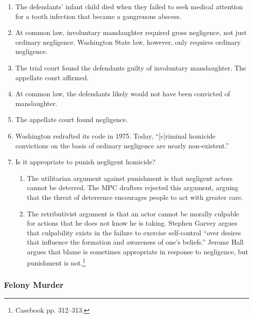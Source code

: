 \begin{enumerate}
    \item The defendants' infant child died when they failed to seek medical attention for a tooth infection that became a gangrenous abscess.
    \item At common law, involuntary manslaughter required gross negligence, not just ordinary negligence. Washington State law, however, only requires ordinary negligence.
    \item The trial court found the defendants guilty of involuntary manslaughter. The appellate court affirmed.
    \item At common law, the defendants likely would not have been convicted of manslaughter.
    \item The appellate court found negligence.
    \item Washington redrafted its code in 1975. Today, ``[c]riminal homicide convictions on the basis of ordinary negligence are nearly non-existent.''
    \item Is it appropriate to punish negligent homicide?
    \begin{enumerate}
        \item The utilitarian argument against punishment is that negligent actors cannot be deterred. The MPC drafters rejected this argument, arguing that the threat of deterrence encourages people to act with greater care.
        \item The retributivist argument is that an actor cannot be morally culpable for actions that he does not know he is taking. Stephen Garvey argues that culpability exists in the failure to exercise self-control ``over desires that influence the formation and awareness of one's beliefs.'' Jerome Hall argues that blame is sometimes appropriate in response to negligence, but punishment is not.\footnote{Casebook pp. 312--313.}
    \end{enumerate}
\end{enumerate}

\subsubsection{Felony Murder}

